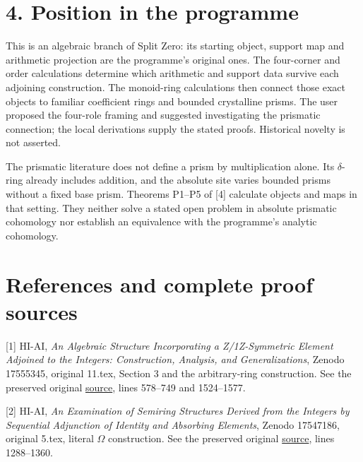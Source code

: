 \documentclass[
]{article}
\begin{document}
\section{4. Position in the programme}\label{position-in-the-programme}

This is an algebraic branch of Split Zero: its starting object, support
map and arithmetic projection are the programme's original ones. The
four-corner and order calculations determine which arithmetic and
support data survive each adjoining construction. The monoid-ring
calculations then connect those exact objects to familiar coefficient
rings and bounded crystalline prisms. The user proposed the four-role
framing and suggested investigating the prismatic connection; the local
derivations supply the stated proofs. Historical novelty is not
asserted.

The prismatic literature does not define a prism by multiplication
alone. Its \(\delta\)-ring already includes addition, and the absolute
site varies bounded prisms without a fixed base prism. Theorems P1--P5
of {[}4{]} calculate objects and maps in that setting. They neither
solve a stated open problem in absolute prismatic cohomology nor
establish an equivalence with the programme's analytic cohomology.

\section{References and complete proof
sources}\label{references-and-complete-proof-sources}

{[}1{]} HI-AI, \emph{An Algebraic Structure Incorporating a
Z/1Z-Symmetric Element Adjoined to the Integers: Construction, Analysis,
and Generalizations}, Zenodo 17555345, original 11.tex, Section 3 and
the arbitrary-ring construction. See the preserved original
\href{https://github.com/KokunoYumeto/zeta-function-research-reader/blob/6af54ea3c8ef99127af327f3103e086c68d482c2/workbenches/splitzero-tandem/branches/identity-absorber-square/sources/17555345_11.tex}{source},
lines 578--749 and 1524--1577.

{[}2{]} HI-AI, \emph{An Examination of Semiring Structures Derived from
the Integers by Sequential Adjunction of Identity and Absorbing
Elements}, Zenodo 17547186, original 5.tex, literal \(\Omega\)
construction. See the preserved original
\href{https://github.com/KokunoYumeto/zeta-function-research-reader/blob/6af54ea3c8ef99127af327f3103e086c68d482c2/workbenches/splitzero-tandem/branches/identity-absorber-square/sources/17547186_5.tex}{source},
lines 1288--1360.
\end{document}
